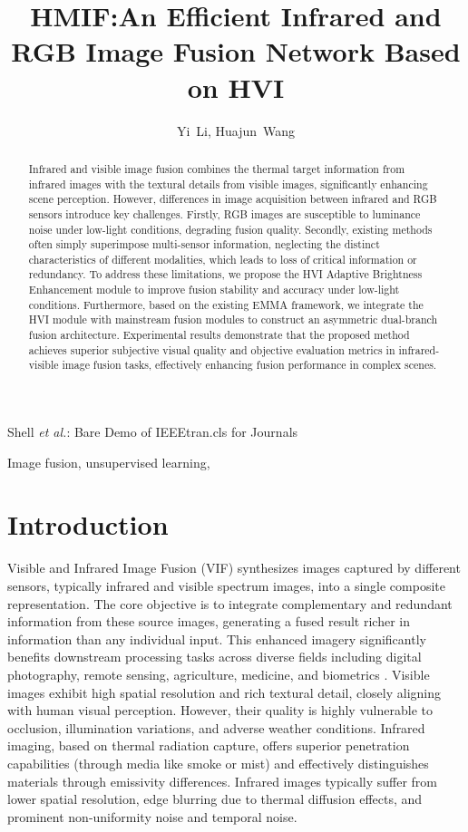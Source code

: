 \documentclass[journal]{IEEEtran}
\begin{document}
\title{HMIF:An Efficient Infrared and RGB Image Fusion Network Based on HVI}
\author{Yi~Li, Huajun~Wang}

\markboth{}
{Shell \MakeLowercase{\textit{et al.}}: Bare Demo of IEEEtran.cls for Journals}
\maketitle

\begin{abstract}
Infrared and visible image fusion combines the thermal target information from infrared images with the textural details from visible images, significantly enhancing scene perception. However, differences in image acquisition between infrared and RGB sensors introduce key challenges. Firstly, RGB images are susceptible to luminance noise under low-light conditions, degrading fusion quality. Secondly, existing methods often simply superimpose multi-sensor information, neglecting the distinct characteristics of different modalities, which leads to loss of critical information or redundancy. To address these limitations, we propose the HVI Adaptive Brightness Enhancement module to improve fusion stability and accuracy under low-light conditions. Furthermore, based on the existing EMMA framework, we integrate the HVI module with mainstream fusion modules to construct an asymmetric dual-branch fusion architecture. Experimental results demonstrate that the proposed method achieves superior subjective visual quality and objective evaluation metrics in infrared-visible image fusion tasks, effectively enhancing fusion performance in complex scenes.

\end{abstract}

\begin{IEEEkeywords}
Image fusion, unsupervised learning, 
\end{IEEEkeywords}
\IEEEpeerreviewmaketitle
\section{Introduction}
Visible and Infrared Image Fusion (VIF) synthesizes images captured by different sensors, typically infrared and visible spectrum images, into a single composite representation. The core objective is to integrate complementary and redundant information from these source images, generating a fused result richer in information than any individual input. This enhanced imagery significantly benefits downstream processing tasks across diverse fields including digital photography, remote sensing, agriculture, medicine, and biometrics \cite{ma2019infrared}.
Visible images exhibit high spatial resolution and rich textural detail, closely aligning with human visual perception. However, their quality is highly vulnerable to occlusion, illumination variations, and adverse weather conditions. Infrared imaging, based on thermal radiation capture, offers superior penetration capabilities (through media like smoke or mist) and effectively distinguishes materials through emissivity differences. Infrared images typically suffer from lower spatial resolution, edge blurring due to thermal diffusion effects, and prominent non-uniformity noise and temporal noise.
\end{document}
